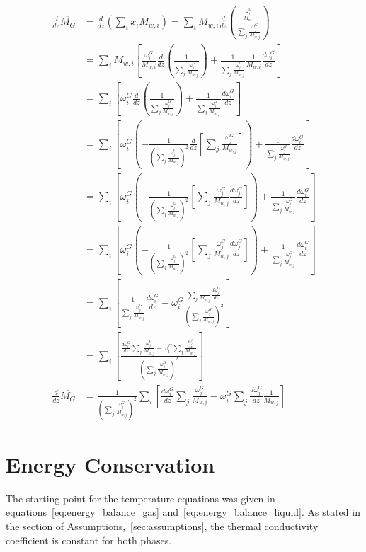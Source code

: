 \documentclass{article}
\begin{document}
\begin{equation}
	\begin{split}
	\frac{d}{dz} \overline{M_G} &=  \frac{d}{dz}\left(\sum_ix_iM_{w,i}\right) = \sum_i M_{w,i} \frac{d}{dz}\left( \frac{\frac{\omega_i^G}{M_{w,i}}}{\sum_j\frac{\omega_j^G}{M_{w,j}}}\right)\\
	&= \sum_i M_{w,i} \left[\frac{\omega_i^G}{M_{w,i}}\frac{d}{dz}\left(\frac{1}{\sum_j \frac{\omega_j^G}{M_{w,j}}} \right) + \frac{1}{\sum_j \frac{\omega_j^G}{M_{w,j}}}  \frac{1}{M_{w,i}}\frac{d \omega_i^G}{dz}\right] \\
	&= \sum_i \left[\omega_i^G\frac{d}{dz}\left(\frac{1}{\sum_j \frac{\omega_j^G}{M_{w,j}}} \right) + \frac{1}{\sum_j \frac{\omega_j^G}{M_{w,j}}}\frac{d \omega_i^G}{dz}\right] \\
	&= \sum_i \left[\omega_i^G\left(-\frac{1}{\left(\sum_j \frac{\omega_j^G}{M_{w,j}}\right)^2} \frac{d}{dz}\left[\sum_j \frac{\omega_j^G}{M_{w,j}} \right]  \right)  + \frac{1}{\sum_j \frac{\omega_j^G}{M_{w,j}}}\frac{d \omega_i^G}{dz}\right] \\
	&= \sum_i \left[\omega_i^G\left(-\frac{1}{\left(\sum_j \frac{\omega_j^G}{M_{w,j}}\right)^2} \left[ \sum_j \frac{\omega_j^G}{M_{w,j}}\frac{d \omega_j^G}{dz} \right]  \right)  + \frac{1}{\sum_j \frac{\omega_j^G}{M_{w,j}}}\frac{d \omega_i^G}{dz}\right] \\
	&= \sum_i \left[\omega_i^G\left(-\frac{1}{\left(\sum_j \frac{\omega_j^G}{M_{w,j}}\right)^2} \left[ \sum_j \frac{\omega_j^G}{M_{w,j}}\frac{d \omega_j^G}{dz} \right]  \right)  + \frac{1}{\sum_j \frac{\omega_j^G}{M_{w,j}}}\frac{d \omega_i^G}{dz}\right] \\
	&= \sum_i \left[\frac{1}{\sum_j \frac{\omega_j^G}{M_{w,j}}}\frac{d \omega_i^G}{dz} - \omega_i^G\frac{\sum_j \frac{1}{M_{w,j}}\frac{d \omega_j^G}{dz}}{\left(\sum_j \frac{\omega_j^G}{M_{w,j}}\right)^2}\right] \\
	&= \sum_i \left[\frac{\frac{d \omega_i^G}{dz}\sum_j \frac{\omega_j^G}{M_{w,j}} - \omega_i^G \sum_j \frac{\frac{d \omega_j^G}{dz}}{M_{w,j}}}{\left(\sum_j \frac{\omega_j^G}{M_{w,j}}\right)^2}\right] \\
	\frac{d}{dz} \overline{M_G} &= \frac{1}{\left(\sum_j \frac{\omega_j^G}{M_{w,j}}\right)^2}\sum_i \left[\frac{d \omega_i^G}{dz}\sum_j \frac{\omega_j^G}{M_{w,j}} - \omega_i^G \sum_j \frac{d \omega_j^G}{dz}\frac{1}{M_{w,j}}\right]
	\end{split}
\end{equation}

\section{Energy Conservation}
The starting point for the temperature equations was given in equations~\ref{eq:energy_balance_gas} and~\ref{eq:energy_balance_liquid}. As stated in the section of Assumptions,~\ref{sec:assumptions}, the thermal conductivity coefficient is constant for both phases. 
\end{document}
